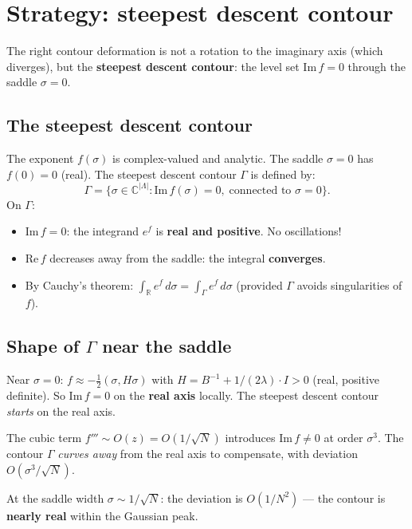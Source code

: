 \documentclass[12pt]{article}
\theoremstyle{definition}
\theoremstyle{remark}
\newcommand{\R}{\mathbb{R}}
\newcommand{\C}{\mathbb{C}}
\newcommand{\La}{\Lambda}
\begin{document}
\section{Strategy: steepest descent contour}

The right contour deformation is not a rotation to the imaginary
axis (which diverges), but the \textbf{steepest descent contour}:
the level set $\mathrm{Im}\,f = 0$ through the saddle $\sigma = 0$.

\subsection{The steepest descent contour}

The exponent $f(\sigma)$ is complex-valued and analytic. The saddle
$\sigma = 0$ has $f(0) = 0$ (real). The steepest descent contour
$\Gamma$ is defined by:
\begin{equation}
  \Gamma = \{\sigma \in \C^{|\La|} : \mathrm{Im}\,f(\sigma) = 0,\;
    \text{connected to } \sigma = 0\}.
\end{equation}
On $\Gamma$:
\begin{itemize}
\item $\mathrm{Im}\,f = 0$: the integrand $e^f$ is \textbf{real
  and positive}. No oscillations!
\item $\mathrm{Re}\,f$ decreases away from the saddle: the integral
  \textbf{converges}.
\item By Cauchy's theorem: $\int_\R e^f\,d\sigma = \int_\Gamma e^f\,d\sigma$
  (provided $\Gamma$ avoids singularities of~$f$).
\end{itemize}

\subsection{Shape of $\Gamma$ near the saddle}

Near $\sigma = 0$: $f \approx -\tfrac{1}{2}(\sigma,H\sigma)$ with
$H = B^{-1} + 1/(2\lambda)\cdot I > 0$ (real, positive definite).
So $\mathrm{Im}\,f = 0$ on the \textbf{real axis} locally. The
steepest descent contour \emph{starts} on the real axis.

The cubic term $f''' \sim O(z) = O(1/\sqrt{N})$ introduces
$\mathrm{Im}\,f \ne 0$ at order $\sigma^3$. The contour
$\Gamma$ \emph{curves away} from the real axis to compensate,
with deviation $O(\sigma^3/\sqrt{N})$.

At the saddle width $\sigma \sim 1/\sqrt{N}$: the deviation is
$O(1/N^2)$ --- the contour is \textbf{nearly real} within the
Gaussian peak.
\end{document}
